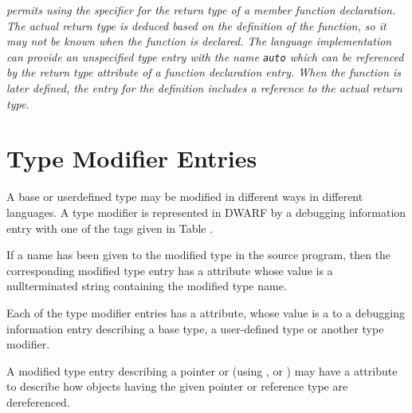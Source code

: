 \textit{ permits using the 
\autoreturntype{} specifier for the return type of a member function declaration. 
The actual return type is deduced based on the definition of the 
function, so it may not be known when the function is declared.  The language 
implementation can provide an unspecified type entry with the name \texttt{auto} which 
can be referenced by the return type attribute of a function declaration entry.  
When the function is later defined, the \DWTAGsubprogram{} entry for the definition
includes a reference to the actual return type.}


\section{Type Modifier Entries}
\label{chap:typemodifierentries}
A base or user\dash defined type may be modified in different ways
in different languages. A type modifier is represented in
DWARF by a debugging information entry with one of the tags
given in Table .

If a name has been given to the modified type in the source
program, then the corresponding modified type entry has
a \DWATname{} attribute 
whose value is a null\dash terminated
string containing the modified type name. 
\bbeb

Each of the type modifier entries has 
a 
\DWATtype{} attribute,
whose value is a  
to a debugging information entry
describing a base type, a user-defined type or another type
modifier.

A modified type entry describing a 
pointer or 
(using \DWTAGpointertype,
\DWTAGreferencetype{} or
\DWTAGrvaluereferencetype) 
may have
a\hypertarget{chap:DWATadressclasspointerorreferencetypes}{}
\DWATaddressclassDEFN{} 
attribute to describe how objects having the given pointer
or reference type 
\bb
are
\eb
dereferenced.

